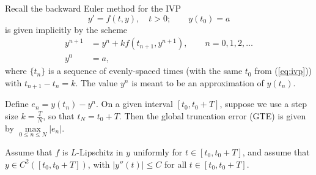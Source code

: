 \documentclass{homework}
\begin{document}
	\question
	Recall the backward Euler method for the IVP
	\begin{equation}
		\label{eq:ivp}
		y' = f(t,y), \quad t > 0; \qquad y(t_0) = a
	\end{equation}
	is given implicitly by the scheme
	\begin{align}
		\label{eq:be_iteration}
		y^{n+1} &= y^n + kf\left(t_{n+1}, y^{n+1}\right), \qquad n = 0,1,2,\dots \\
		y^0 &= a,
	\end{align}
	where $\{t_n\}$ is a sequence of evenly-spaced times (with the same $t_0$ from (\ref{eq:ivp})) with $t_{n+1} - t_n = k$. The value $y^n$ is meant to be an approximation of $y(t_n)$.
	
	Define $e_n = y(t_{n}) - y^{n}$. On a given interval $[t_0, t_0 + T]$, suppose we use a step size $k = \frac{T}{N}$, so that $t_N = t_0 + T$. Then the global truncation error (GTE) is given by $\max\limits_{0\le n\le N}|e_n|$.
	
	Assume that $f$ is $L$-Lipschitz in $y$ uniformly for $t \in [t_0, t_0 + T]$, and assume that $y \in C^2([t_0, t_0 + T])$, with $|y''(t)| \le C$ for all $t \in [t_0, t_0 + T]$.
	
\end{document}
